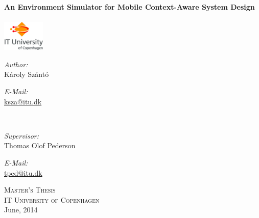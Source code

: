 \begin{titlepage}

\begin{center}


\HRule \\[0.4cm]
{ \huge \bfseries An Environment Simulator for Mobile Context-Aware System Design}\\[0.4cm]

\HRule \\[1.5cm]

\includegraphics[width=0.15\textwidth]{gfx/itu_logo}\\[5cm]    

\begin{minipage}{0.4\textwidth}
\begin{flushleft} \large
\emph{Author:}\\
K\'aroly Sz\'ant\'o\\
\end{flushleft}
\end{minipage}
\begin{minipage}{0.4\textwidth}
\begin{flushright} \large
\emph{E-Mail:} \\
\href{mailto:ksza@itu.dk}{ksza@itu.dk}\\
\end{flushright}
\end{minipage}\\[0.8cm]

\begin{minipage}{0.4\textwidth}
\begin{flushleft} \large
\emph{Supervisor:}\\
Thomas Olof Pederson\\
\end{flushleft}
\end{minipage}
\begin{minipage}{0.4\textwidth}
\begin{flushright} \large
\emph{E-Mail:} \\
\href{mailto:tped@itu.dk}{tped@itu.dk}\\
\end{flushright}
\end{minipage}

\vfill

\textsc{\LARGE Master's Thesis}\\[0.2cm]
\textsc{\LARGE IT University of Copenhagen}\\[0.2cm]
{\large June, 2014}

\end{center}

\end{titlepage}

